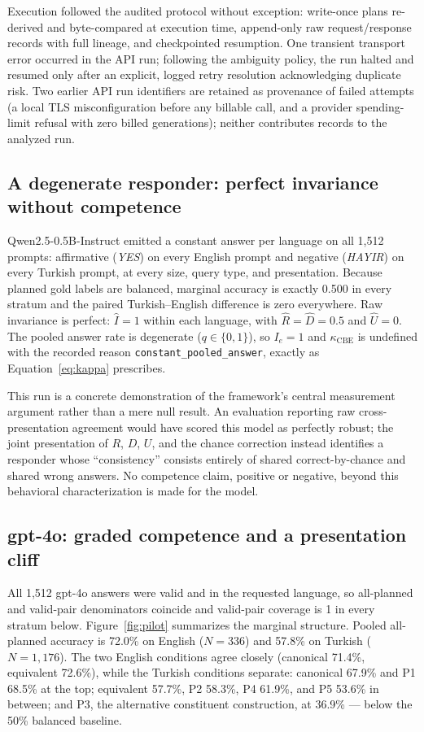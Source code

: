 Execution followed the audited protocol without exception: write-once plans re-derived and byte-compared
at execution time, append-only raw request/response records with full lineage, and checkpointed resumption.
One transient transport error occurred in the API run; following the ambiguity policy, the run halted and
resumed only after an explicit, logged retry resolution acknowledging duplicate risk. Two earlier API run
identifiers are retained as provenance of failed attempts (a local TLS misconfiguration before any billable
call, and a provider spending-limit refusal with zero billed generations); neither contributes records to
the analyzed run.

\subsection{A degenerate responder: perfect invariance without competence}

Qwen2.5-0.5B-Instruct emitted a constant answer per language on all 1,512 prompts: affirmative
(\emph{YES}) on every English prompt and negative (\emph{HAYIR}) on every Turkish prompt, at every size,
query type, and presentation. Because planned gold labels are balanced, marginal accuracy is exactly 0.500
in every stratum and the paired Turkish--English difference is zero everywhere. Raw invariance is perfect:
$\widehat{I} = 1$ within each language, with $\widehat{R} = \widehat{D} = 0.5$ and $\widehat{U} = 0$.
The pooled answer rate is degenerate ($q \in \{0, 1\}$), so $I_e = 1$ and $\kappa_{\mathrm{CBE}}$ is
undefined with the recorded reason \texttt{constant\_pooled\_answer}, exactly as
Equation~\eqref{eq:kappa} prescribes.

This run is a concrete demonstration of the framework's central measurement argument rather than a mere
null result. An evaluation reporting raw cross-presentation agreement would have scored this model as
perfectly robust; the joint presentation of $R$, $D$, $U$, and the chance correction instead identifies a
responder whose ``consistency'' consists entirely of shared correct-by-chance and shared wrong answers.
No competence claim, positive or negative, beyond this behavioral characterization is made for the model.

\subsection{gpt-4o: graded competence and a presentation cliff}

All 1,512 gpt-4o answers were valid and in the requested language, so all-planned and valid-pair
denominators coincide and valid-pair coverage is 1 in every stratum below. Figure~\ref{fig:pilot}
summarizes the marginal structure. Pooled all-planned accuracy is 72.0\% on English ($N = 336$) and
57.8\% on Turkish ($N = 1{,}176$). The two English conditions agree closely (canonical 71.4\%, equivalent
72.6\%), while the Turkish conditions separate: canonical 67.9\% and P1 68.5\% at the top; equivalent
57.7\%, P2 58.3\%, P4 61.9\%, and P5 53.6\% in between; and P3, the alternative constituent construction,
at 36.9\% --- below the 50\% balanced baseline.

